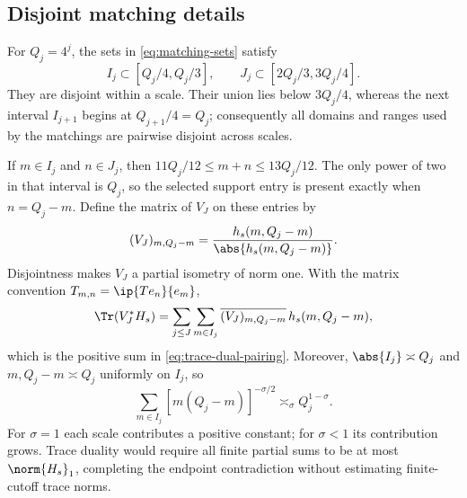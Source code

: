 \subsection{Disjoint matching details}

For $Q_j=4^j$, the sets in \cref{eq:matching-sets} satisfy
\[
 I_j\subset[Q_j/4,Q_j/3],
 \qquad
 J_j\subset[2Q_j/3,3Q_j/4].
\]
They are disjoint within a scale.  Their union lies below $3Q_j/4$, whereas
the next interval $I_{j+1}$ begins at $Q_{j+1}/4=Q_j$; consequently all
domains and ranges used by the matchings are pairwise disjoint across
scales.

If $m\in I_j$ and $n\in J_j$, then
$11Q_j/12\le m+n\le13Q_j/12$.  The only power of two in that interval is
$Q_j$, so the selected support entry is present exactly when
$n=Q_j-m$.  Define the matrix of $V_J$ on these entries by
\[
  (V_J)_{m,Q_j-m}
  =\frac{h_s(m,Q_j-m)}{\abs{h_s(m,Q_j-m)}}.
\]
Disjointness makes $V_J$ a partial isometry of norm one.  With the matrix
convention $T_{m,n}=\ip{Te_n}{e_m}$,
\[
  \Tr(V_J^*H_s)
  =\sum_{j\le J}\sum_{m\in I_j}
    \overline{(V_J)_{m,Q_j-m}}\,h_s(m,Q_j-m),
\]
which is the positive sum in \cref{eq:trace-dual-pairing}.  Moreover,
$\abs{I_j}\asymp Q_j$ and
$m,Q_j-m\asymp Q_j$ uniformly on $I_j$, so
\[
  \sum_{m\in I_j}[m(Q_j-m)]^{-\sigma/2}
  \asymp_\sigma Q_j^{1-\sigma}.
\]
For $\sigma=1$ each scale contributes a positive constant; for
$\sigma<1$ its contribution grows.  Trace duality would require all finite
partial sums to be at most $\norm{H_s}_1$, completing the endpoint
contradiction without estimating finite-cutoff trace norms.

